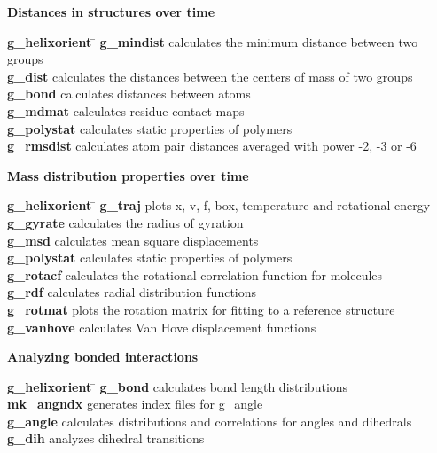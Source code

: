 \begin{description}
\item {\large\bf Distances in structures over time}
\vspace{-2ex}\begin{tabbing}
{\bf g\_helixorient} \= \kill
{\bf g\_mindist} \> calculates the minimum distance between two groups \\
{\bf g\_dist} \> calculates the distances between the centers of mass of two groups \\
{\bf g\_bond} \> calculates distances between atoms \\
{\bf g\_mdmat} \> calculates residue contact maps \\
{\bf g\_polystat} \> calculates static properties of polymers \\
{\bf g\_rmsdist} \> calculates atom pair distances averaged with power -2, -3 or -6 \\
\end{tabbing}\vspace{-2ex}

\item {\large\bf Mass distribution properties over time}
\vspace{-2ex}\begin{tabbing}
{\bf g\_helixorient} \= \kill
{\bf g\_traj} \> plots x, v, f, box, temperature and rotational energy \\
{\bf g\_gyrate} \> calculates the radius of gyration \\
{\bf g\_msd} \> calculates mean square displacements \\
{\bf g\_polystat} \> calculates static properties of polymers \\
{\bf g\_rotacf} \> calculates the rotational correlation function for molecules \\
{\bf g\_rdf} \> calculates radial distribution functions \\
{\bf g\_rotmat} \> plots the rotation matrix for fitting to a reference structure \\
{\bf g\_vanhove} \> calculates Van Hove displacement functions \\
\end{tabbing}\vspace{-2ex}

\item {\large\bf Analyzing bonded interactions}
\vspace{-2ex}\begin{tabbing}
{\bf g\_helixorient} \= \kill
{\bf g\_bond} \> calculates bond length distributions \\
{\bf mk\_angndx} \> generates index files for g\_angle \\
{\bf g\_angle} \> calculates distributions and correlations for angles and dihedrals \\
{\bf g\_dih} \> analyzes dihedral transitions \\
\end{tabbing}\vspace{-2ex}


\end{description}
